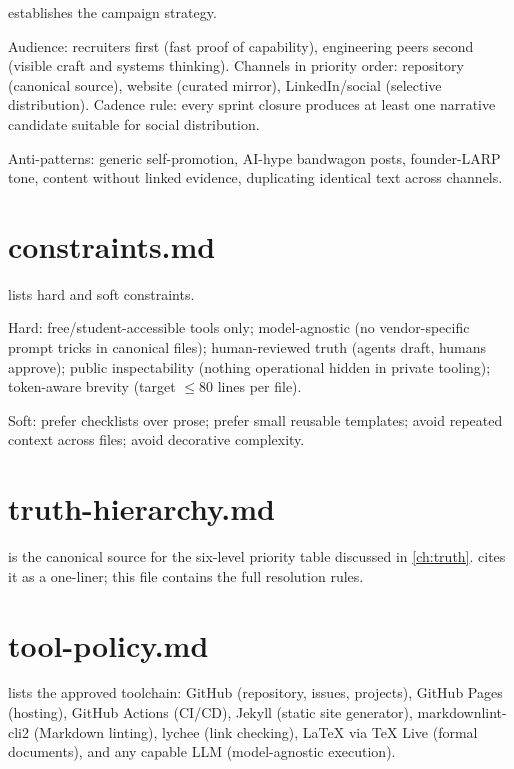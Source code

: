 \documentclass[a4paper,11pt,openany]{report}
\begin{document}
 establishes the campaign strategy.

Audience: recruiters first (fast proof of capability), engineering peers second
(visible craft and systems thinking). Channels in priority order: repository
(canonical source), website (curated mirror), LinkedIn/social (selective
distribution). Cadence rule: every sprint closure produces at least one
narrative candidate suitable for social distribution.

Anti-patterns: generic self-promotion, AI-hype bandwagon posts, founder-LARP
tone, content without linked evidence, duplicating identical text across
channels.

\section{constraints.md}

 lists hard and soft constraints.

Hard: free/student-accessible tools only; model-agnostic (no vendor-specific
prompt tricks in canonical files); human-reviewed truth (agents draft, humans
approve); public inspectability (nothing operational hidden in private tooling);
token-aware brevity (target $\leq 80$ lines per file).

Soft: prefer checklists over prose; prefer small reusable templates; avoid
repeated context across files; avoid decorative complexity.

\section{truth-hierarchy.md}

 is the canonical source for the
six-level priority table discussed in \cref{ch:truth}. 
cites it as a one-liner; this file contains the full resolution rules.

\section{tool-policy.md}

 lists the approved toolchain: GitHub
(repository, issues, projects), GitHub Pages (hosting), GitHub Actions (CI/CD),
Jekyll (static site generator), markdownlint-cli2 (Markdown linting), lychee
(link checking), \LaTeX{} via TeX Live (formal documents), and any capable LLM
(model-agnostic execution).
\end{document}
